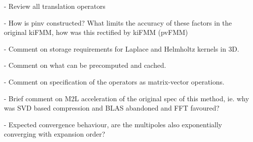 - Review all translation operators

- How is pinv constructed? What limits the accuracy of these factors in the original kiFMM, how was this rectified by kiFMM (pvFMM)

- Comment on storage requirements for Laplace and Helmholtz kernels in 3D.

- Comment on what can be precomputed and cached.

- Comment on specification of the operators as matrix-vector operations.

- Brief comment on M2L acceleration of the original spec of this method, ie. why was SVD based compression and BLAS abandoned and FFT favoured?

- Expected convergence behaviour, are the multipoles also exponentially converging with expansion order?

